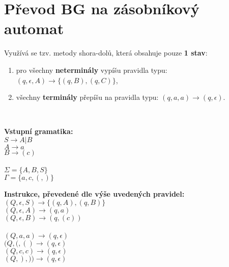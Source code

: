 \section{Převod BG na zásobníkový automat}
Využívá se tzv. metody shora-dolů, která obsahuje pouze \textbf{1 stav}:
\begin{enumerate}
    \item pro všechny \textbf{neterminály} vypíšu pravidla typu: $(q, \epsilon, A) \rightarrow \{(q, B), (q, C)\}$,
    \item všechny \textbf{terminály} přepíšu na pravidla typu: $(q, a, a) \rightarrow (q, \epsilon)$.
\end{enumerate}

\noindent\\\begin{minipage}[t]{0.35\textwidth}
    \textbf{Vstupní gramatika:}\\
    $S \rightarrow A | B$\\
    $A \rightarrow a$\\
    $B \rightarrow (c)$\\\smallskip\\
    $\Sigma = \{A, B, S\}$\\
    $\Gamma = \{a, c, (, )\}$
\end{minipage}
\begin{minipage}[t]{0.65\textwidth}
    \textbf{Instrukce, převedené dle výše uvedených pravidel:}\\
    $(Q, \epsilon, S) \rightarrow \{(q, A), (q, B)\}$\\
    $(Q, \epsilon, A) \rightarrow (q, a)$\\
    $(Q, \epsilon, B) \rightarrow (q, (c))$\\\smallskip\\
    $(Q, a, a) \rightarrow (q, \epsilon)$\\
    $(Q, (, () \rightarrow (q, \epsilon)$\\
    $(Q, c, c) \rightarrow (q, \epsilon)$\\
    $(Q, ), )) \rightarrow (q, \epsilon)$\\
\end{minipage}
